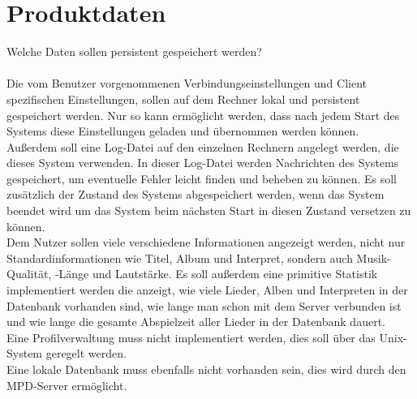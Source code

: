 \section{Produktdaten}
Welche Daten sollen persistent gespeichert werden?\ \\ \\
Die vom Benutzer vorgenommenen Verbindungseinstellungen und Client spezifischen Einstellungen,
sollen auf dem Rechner lokal und persistent gespeichert werden. Nur so kann ermöglicht werden,
dass nach jedem Start des Systems diese Einstellungen geladen und übernommen werden können.\ \\
Außerdem soll eine Log-Datei auf den einzelnen Rechnern angelegt werden, die dieses System
verwenden. In dieser Log-Datei werden Nachrichten des Systems gespeichert, um eventuelle Fehler
leicht finden und beheben zu können. Es soll zusätzlich der Zustand des Systems abgespeichert werden,
wenn das System beendet wird um das System beim nächsten Start in diesen Zustand versetzen zu können.\ \\
Dem Nutzer sollen viele verschiedene Informationen angezeigt werden, nicht nur Standardinformationen
wie Titel, Album und Interpret, sondern auch Musik-Qualität, -Länge und Lautstärke.
Es soll außerdem eine primitive Statistik implementiert werden die anzeigt, wie viele Lieder, Alben und
Interpreten in der Datenbank vorhanden sind, wie lange man schon mit dem Server verbunden ist und wie 
lange die gesamte Abspielzeit aller Lieder in der Datenbank dauert.\ \\
Eine Profilverwaltung muss nicht implementiert werden, dies soll über das Unix-System geregelt werden.\ \\
Eine lokale Datenbank muss ebenfalls nicht vorhanden sein, dies wird durch den MPD-Server ermöglicht.\ \\
